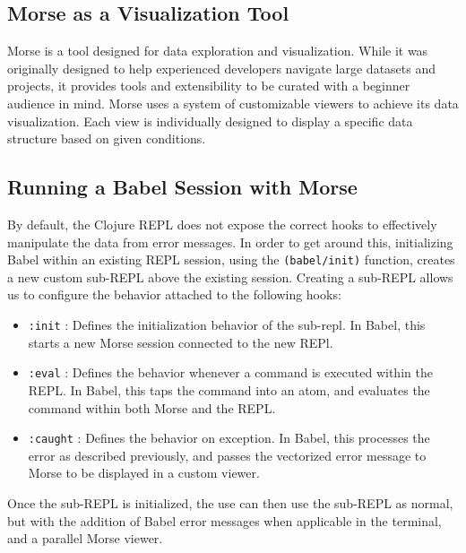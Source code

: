 \documentclass[12pt]{article}
\begin{document}
\subsection{Morse as a Visualization Tool}\label{subsec:Morse}
Morse is a tool designed for data exploration and visualization.
While it was originally designed to help experienced developers navigate large datasets and projects, 
it provides tools and extensibility to be curated with a beginner audience in mind.
Morse uses a system of customizable viewers to achieve its data visualization.
Each view is individually designed to display a specific data structure based on given conditions.

\subsection{Running a Babel Session with Morse}\label{subsec:babel-w-morse}

By default, the Clojure REPL does not expose the correct hooks to effectively manipulate the data from error messages.
In order to get around this, initializing Babel within an existing REPL session, using the \texttt{(babel/init)} function, creates a new custom sub-REPL above the existing session.
Creating a sub-REPL allows us to configure the behavior attached to the following hooks:
\begin{itemize}
	\item \texttt{:init} : Defines the initialization behavior of the sub-repl. 
		In Babel, this starts a new Morse session connected to the new REPl. \\
	\item \texttt{:eval} : Defines the behavior whenever a command is executed within the REPL. 
		In Babel, this taps the command into an atom, and evaluates the command within both Morse and the REPL. \\
	\item \texttt{:caught} : Defines the behavior on exception. 
		In Babel, this processes the error as described previously, 
			and passes the vectorized error message to Morse to be displayed in a custom viewer. 
\end{itemize}
Once the sub-REPL is initialized, the use can then use the sub-REPL as normal, but with the addition of Babel error messages when applicable in the terminal, and a parallel Morse viewer.
\end{document}
